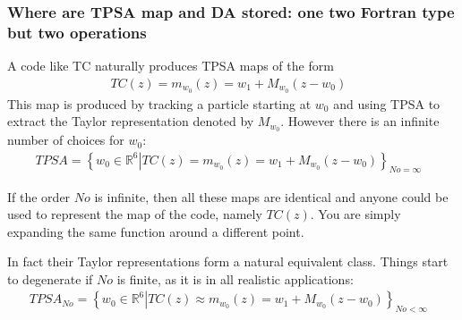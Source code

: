 \documentclass{hitec}     %
\begin{document}
{{{{\subsubsection{Where are  TPSA map and DA stored: one two Fortran type but two operations}\label{s:storage}

A code like TC naturally produces TPSA maps of the form
%
\begin{align}TC(z)=
{m}_{{w}_{0}}\left({z}\right)={w}_{1}+{M}_{{w}_{0}}(z-{w}_{0})~~~\label{eq:tpsamap} \end{align}
%
%
This map is produced by tracking a particle starting at  ${w}_{0}$ and using TPSA to extract the Taylor representation denoted by ${M}_{{w}_{0}}$.  However there is an infinite number of choices for $w_0$:
%
\begin{align}TPSA=
{\left\{{{w}_{0}\in {\mathbb{R}}^{6}\left|{TC(z)=
{m}_{{w}_{0}}\left({z}\right)={w}_{1}+{M}_{{w}_{0}}(z-{w}_{0})}\right.}\right\}}_{No=
\infty }~~~\label{eq:tpsamapd} \end{align}

If the order $No$ is infinite, then all these maps are identical and anyone could be used to represent the map of the code, namely $TC(z)$. You are simply expanding the same function around a different point.

In fact their Taylor representations form a natural equivalent class. Things start to degenerate if $No$ is finite, as it is in all realistic applications:
%
\begin{align}{TPSA}_{No}=
{\left\{{{w}_{0}\in {\mathbb{R}}^{6}\left|{TC(z)\approx {m}_{{w}_{0}}\left({z}\right)={w}_{1}+{M}_{{w}_{0}}(z-{w}_{0})}\right.}\right\}}_{No<\infty }~~~\label{eq:tpsamapda} \end{align}

}}}}
\end{document}
